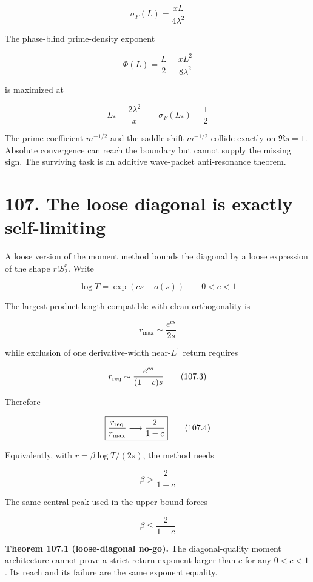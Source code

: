 \documentclass[
  11pt,
]{book}
\renewenvironment{quote}
  {\begin{tcolorbox}[
      enhanced,
      breakable,
      colback=tncream,
      colframe=tnrust,
      boxrule=0.8pt,
      arc=1.5pt,
      left=7pt,
      right=7pt,
      top=6pt,
      bottom=6pt]}
  {\end{tcolorbox}}
\begin{document}
\[
\sigma_F(L)=\frac{xL}{4\lambda^2}
\tag{106.11}
\]

The phase-blind prime-density exponent

\[
\Phi(L)=\frac L2-\frac{xL^2}{8\lambda^2}
\tag{106.12}
\]

is maximized at

\[
L_*=\frac{2\lambda^2}{x}
\qquad
\boxed{\sigma_F(L_*)=\frac12}
\tag{106.13}
\]

The prime coefficient \(m^{-1/2}\) and the saddle shift \(m^{-1/2}\)
collide exactly on \(\Re s=1\). Absolute convergence can reach the
boundary but cannot supply the missing sign. The surviving task is an
additive wave-packet anti-resonance theorem.

\section{107. The loose diagonal is exactly
self-limiting}\label{the-loose-diagonal-is-exactly-self-limiting}

A loose version of the moment method bounds the diagonal by a loose
expression of the shape \(r!S_2^r\). Write

\[
\log T=\exp(cs+o(s))
\qquad 0<c<1
\tag{107.1}
\]

The largest product length compatible with clean orthogonality is

\[
r_{\max}\sim\frac{e^{cs}}{2s}
\tag{107.2}
\]

while exclusion of one derivative-width near-\(L^1\) return requires

\[
r_{\rm req}\sim\frac{e^{cs}}{(1-c)s}
\tag{107.3}
\]

Therefore

\[
\boxed{
\frac{r_{\rm req}}{r_{\max}}
\longrightarrow\frac{2}{1-c}
}
\tag{107.4}
\]

Equivalently, with \(r=\beta\log T/(2s)\), the method needs

\[
\beta>\frac{2}{1-c}
\tag{107.5}
\]

The same central peak used in the upper bound forces

\[
\beta\le\frac{2}{1-c}
\tag{107.6}
\]

\begin{quote}
\textbf{Theorem 107.1 (loose-diagonal no-go).} The diagonal-quality
moment architecture cannot prove a strict return exponent larger than
\(c\) for any \(0<c<1\). Its reach and its failure are the same exponent
equality.
\end{quote}
\end{document}
